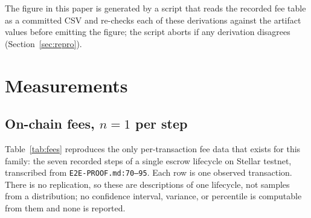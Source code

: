 \documentclass[sigconf,review]{acmart}
\begin{document}
The figure in this paper is generated by a script that reads the recorded fee
table as a committed CSV and re-checks each of these derivations against the
artifact values before emitting the figure; the script aborts if any
derivation disagrees (Section~\ref{sec:repro}).


\section{Measurements}
\label{sec:measurements}

\subsection{On-chain fees, $n=1$ per step}

Table~\ref{tab:fees} reproduces the only per-transaction fee data that exists
for this family: the seven recorded steps of a single escrow lifecycle on
Stellar testnet, transcribed from \texttt{E2E-PROOF.md:70--95}. Each row is one
observed transaction. There is no replication, so these are descriptions of one
lifecycle, not samples from a distribution; no confidence interval, variance,
or percentile is computable from them and none is reported.
\end{document}
